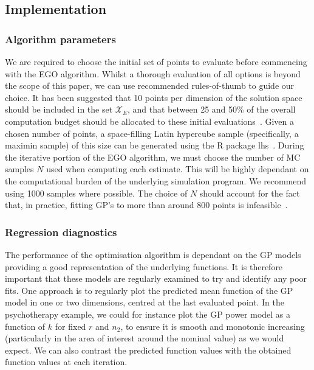 \documentclass{article} %
\begin{document}
\subsection{Implementation}

\subsubsection{Algorithm parameters}

We are required to choose the initial set of points to evaluate before commencing with the EGO algorithm. Whilst a thorough evaluation of all options is beyond the scope of this paper, we can  use recommended rules-of-thumb to guide our choice. It has been suggested that 10 points per dimension of the solution space should be included in the set $\mathcal{X}_{E}$, and that between 25 and 50\% of the overall computation budget should be allocated to these initial evaluations~\cite{}. Given a chosen number of points, a space-filling Latin hypercube sample (specifically, a maximin sample) of this size can be generated using the R package lhs~\cite{Carnell2016}. During the iterative portion of the EGO algorithm, we must choose the number of MC samples $N$ used when computing each estimate. This will be highly dependant on the computational burden of the underlying simulation program. We recommend using 1000 samples where possible. The choice of $N$ should account for the fact that, in practice, fitting GP's to more than around 800 points is infeasible~\cite{Chevalier2014}.


\subsubsection{Regression diagnostics}

The performance of the optimisation algorithm is dependant on the GP models providing a good representation of the underlying functions. It is therefore important that these models are regularly examined to try and identify any poor fits. One approach is to regularly plot the predicted mean function of the GP model in one or two dimensions, centred at the last evaluated point. In the psychotherapy example, we could for instance plot the GP power model as a function of $k$ for fixed $r$ and $n_{2}$, to ensure it is smooth and monotonic increasing (particularly in the area of interest around the nominal value) as we would expect. We can also contrast the predicted function values with the obtained function values at each iteration.
\end{document}
